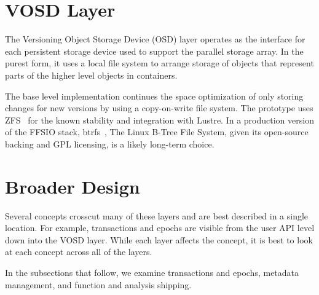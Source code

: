 \documentclass[conference]{IEEEtran} \pdfpagewidth=8.5in
\begin{document}
\section{VOSD Layer}
\label{sec:vosd}

The Versioning Object Storage Device (OSD) layer operates as the interface for
each persistent storage device used to support the parallel storage array. In
the purest form, it uses a local file system to arrange storage of objects that
represent parts of the higher level objects in containers.

The base level implementation continues the space optimization of only storing
changes for new versions by using a copy-on-write file system. The prototype
uses ZFS~\cite{zhang:2010:zfs} for the known stability and integration with
Lustre. In a production version of the FFSIO stack,
btrfs~\cite{rodeh:2013:btrfs}, The Linux B-Tree File System, given its
open-source backing and GPL licensing, is a likely long-term choice.

%
%

\section{Broader Design}
\label{sec:broader}

Several concepts crosscut many of these layers and are best described in a
single location. For example, transactions and epochs are visible from the
user API level down into the VOSD layer. While each layer affects the concept,
it is best to look at each concept across all of the layers.

In the subsections that follow, we examine transactions and epochs, metadata
management, and function and analysis shipping.
\end{document}
